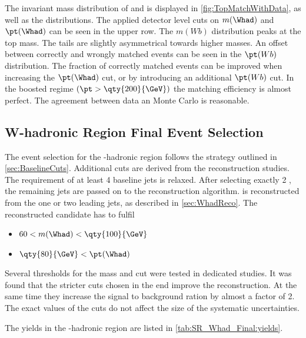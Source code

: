 The invariant mass distribution of \Whad and \Wb is displayed
in \cref{fig:TopMatchWithData}, as well as the \pt distributions.
The applied detector level cuts on \(m(\Whad)\) and \(\pt(\Whad)\) can be seen
in the upper row. The \(m(Wb)\) distribution peaks at the top mass.
The tails are slightly asymmetrical towards higher masses.
An offset between correctly and wrongly matched events can be seen
in the \(\pt(Wb)\) distribution. The fraction of correctly matched events
can be improved when increasing the \(\pt(\Whad)\) cut,
or by introducing an additional \(\pt(Wb)\) cut.
In the boosted regime \((\pt > \qty{200}{\GeV})\) the matching efficiency
is almost perfect. The agreement between data an Monte Carlo is reasonable.

\subsection{W-hadronic Region Final Event Selection}%

The event selection for the \Wboson-hadronic region follows the strategy outlined
in \cref{sec:BaselineCuts}.
Additional cuts are derived from the \Whad reconstruction studies.
The requirement of at least 4 baseline jets is relaxed.
After selecting exactly 2 \bjets, the remaining jets are passed
on to the \Whad reconstruction algorithm.
\Whad is reconstructed from the one or two leading jets, as described
in \cref{sec:WhadReco}.
The reconstructed \Whad candidate has to fulfil
\begin{itemize}
    \item \( 60 < m(\Whad) < \qty{100}{\GeV} \)
    \item \( \qty{80}{\GeV} < \pt(\Whad) \)
\end{itemize}
Several thresholds for the mass and \pt cut were tested in dedicated studies.
It was found that the stricter cuts chosen in the end improve the \Whad reconstruction.
At the same time they increase the signal to background ration by almost a factor of 2.
The exact values of the \Whad cuts do not affect the size of the systematic uncertainties.

The yields in the \Wboson-hadronic region are listed in
\cref{tab:SR_Whad_Final:yields}.

\begin{table}[htbp]
  \begin{center}
    
  \end{center}
  \caption{Yields of individual signal and background samples in the
    \Wboson-hadronic measurement region.
    The total expected yield is using the nominal \tW DR sample.
    Uncertainties are statistical only.}%
  \label{tab:SR_Whad_Final:yields}
\end{table}

